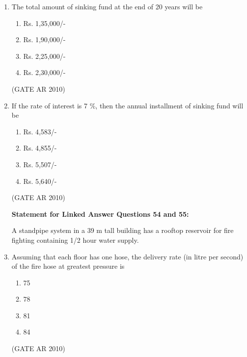 \documentclass[journal]{IEEEtran}
\begin{document}
\begin{enumerate}
\textbf{Linked Answer Questions}

\textbf{Statement for Linked Answer Questions 52 and 53:}

A person has purchased an old building at a cost of Rs. 2,50,000/-, excluding the cost of land. The scrap value of the building is 10 \% of the cost of purchase and the future life of the building is 20 years.

\item The total amount of sinking fund at the end of 20 years will be
\begin{multicols}{4}
\begin{enumerate}
\item Rs. 1,35,000/-
\item Rs. 1,90,000/-
\item Rs. 2,25,000/-
\item Rs. 2,30,000/-
\end{enumerate}
\end{multicols}
\hfill (GATE AR 2010)

\item If the rate of interest is 7 \%, then the annual installment of sinking fund will be
\begin{multicols}{4}
\begin{enumerate}
\item Rs. 4,583/-
\item Rs. 4,855/-
\item Rs. 5,507/-
\item Rs. 5,640/-
\end{enumerate}
\end{multicols}
\hfill (GATE AR 2010)

\textbf{Statement for Linked Answer Questions 54 and 55:}

A standpipe system in a 39 m tall building has a rooftop reservoir for fire fighting containing 1/2 hour water supply.

\item Assuming that each floor has one hose, the delivery rate (in litre per second) of the fire hose at greatest pressure is
\begin{multicols}{2}
\begin{enumerate}
\item 75
\item 78
\item 81
\item 84
\end{enumerate}
\end{multicols}
\hfill (GATE AR 2010)


\end{enumerate}
\end{document}
